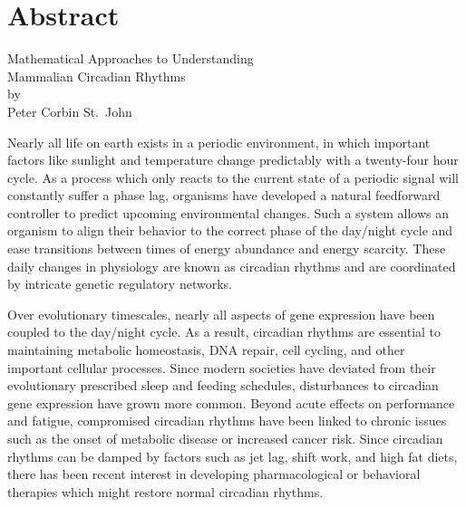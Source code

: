 \chapter*{Abstract}
\vspace{-3ex}
\begin{center}
  {\large Mathematical Approaches to Understanding\\ Mammalian Circadian Rhythms\\}
by\\
{\large Peter Corbin St.\ John}
\end{center}

Nearly all life on earth exists in a periodic environment, in which important factors like sunlight and temperature change predictably with a twenty-four hour cycle.
As a process which only reacts to the current state of a periodic signal will constantly suffer a phase lag, organisms have developed a natural feedforward controller to predict upcoming environmental changes.
Such a system allows an organism to align their behavior to the correct phase of the day/night cycle and ease transitions between times of energy abundance and energy scarcity.
These daily changes in physiology are known as circadian rhythms and are coordinated by intricate genetic regulatory networks.

Over evolutionary timescales, nearly all aspects of gene expression have been coupled to the day/night cycle.
As a result, circadian rhythms are essential to maintaining metabolic homeostasis, DNA repair, cell cycling, and other important cellular processes.
Since modern societies have deviated from their evolutionary prescribed sleep and feeding schedules, disturbances to circadian gene expression have grown more common.
Beyond acute effects on performance and fatigue, compromised circadian rhythms have been linked to chronic issues such as the onset of metabolic disease or increased cancer risk.
Since circadian rhythms can be damped by factors such as jet lag, shift work, and high fat diets, there has been recent interest in developing pharmacological or behavioral therapies which might restore normal circadian rhythms.

